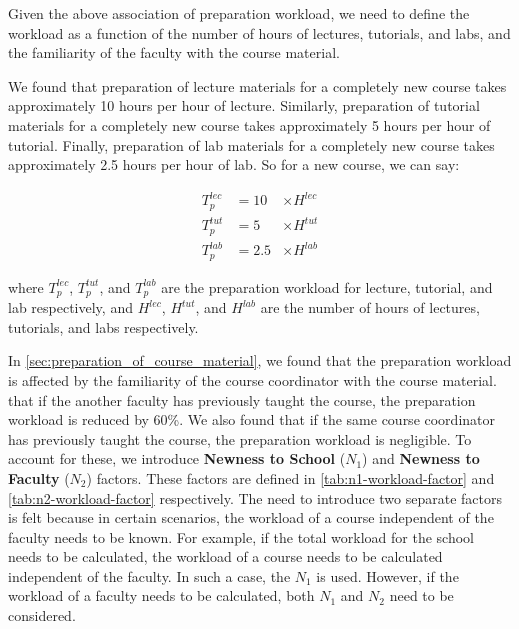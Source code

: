 Given the above association of preparation workload, we need to define the workload as a function of the number of hours of lectures, tutorials, and labs, and the familiarity of the faculty with the course material.

We found that preparation of lecture materials for a completely new course takes approximately 10 hours per hour of lecture. Similarly, preparation of tutorial materials for a completely new course takes approximately 5 hours per hour of tutorial. Finally, preparation of lab materials for a completely new course takes approximately 2.5 hours per hour of lab. So for a new course, we can say:

\begin{equation}
  \label{eq:preparation-workload}
  \begin{aligned}
    T_p^{lec} & = 10  & \times H^{lec} \\
    T_p^{tut} & = 5   & \times H^{tut} \\
    T_p^{lab} & = 2.5 & \times H^{lab}
  \end{aligned}
\end{equation}

where \(T_p^{lec}\), \(T_p^{tut}\), and \(T_p^{lab}\) are the preparation workload for lecture, tutorial, and lab respectively, and \(H^{lec}\), \(H^{tut}\), and \(H^{lab}\) are the number of hours of lectures, tutorials, and labs respectively.

In \autoref{sec:preparation_of_course_material}, we found that the preparation workload is affected by the familiarity of the course coordinator with the course material.  that if the another faculty has previously taught the course, the preparation workload is reduced by 60\%. We also found that if the same course coordinator has previously taught the course, the preparation workload is negligible. To account for these, we introduce \textbf{Newness to School} (\(N_1\)) and \textbf{Newness to Faculty} (\(N_2\)) factors. These factors are defined in \autoref{tab:n1-workload-factor} and \autoref{tab:n2-workload-factor} respectively. The need to introduce two separate factors is felt because in certain scenarios, the workload of a course independent of the faculty needs to be known. For example, if the total workload for the school needs to be calculated, the workload of a course needs to be calculated independent of the faculty. In such a case, the \(N_1\) is used. However, if the workload of a faculty needs to be calculated, both \(N_1\) and \(N_2\) need to be considered.

